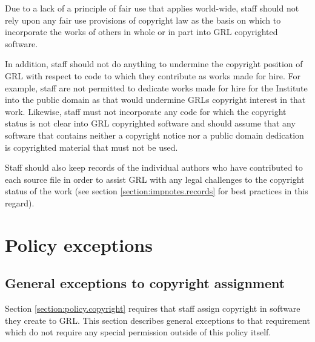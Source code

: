 \documentclass[10pt,a4paper]{article}
\begin{document}
\par Due to a lack of a principle of fair use that applies world-wide, staff should not 
rely upon any fair use provisions of copyright law as the basis on which to 
incorporate the works of others in whole or in part into GRL copyrighted software. 

\par In addition, staff should not do anything to undermine the copyright position of GRL 
with respect to code to which they contribute as works made for hire. For example, 
staff are not permitted to dedicate works made for hire for the Institute into the 
public domain as that would undermine GRLs copyright interest in that work. 
Likewise, staff must not incorporate any code for which the copyright status is 
not clear into GRL copyrighted software and should assume that any software 
that contains neither a copyright notice nor a public domain dedication is copyrighted 
material that must not be used. 


\par Staff should also keep records of the individual authors who have contributed to 
each source file in order to assist GRL with any legal challenges to the copyright 
status of the work (see section \ref{section:impnotes.records} for best practices in this regard). 




\section{Policy exceptions}
\label{section:exceptions}

\subsection{General exceptions to copyright assignment}
\label{section:exceptions.general}
Section \ref{section:policy.copyright} requires that staff assign copyright in 
software they create to GRL. This section describes general exceptions to 
that requirement which do not require any special permission outside of this 
policy itself. 
\end{document}
